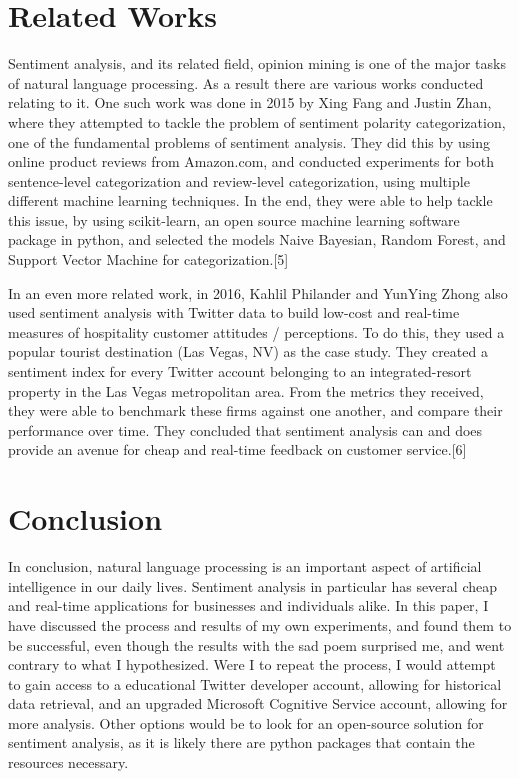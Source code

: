 \documentclass[]{article}
\begin{document}
    \section{Related Works}
    Sentiment analysis, and its related field, opinion mining is one of the major tasks of natural language processing.
    As a result there are various works conducted relating to it. One such work was done in 2015 by Xing Fang and Justin Zhan,
    where they attempted to tackle the problem of sentiment polarity categorization, one of the fundamental problems of 
    sentiment analysis. They did this by using online product reviews from Amazon.com, and conducted experiments for
    both sentence-level categorization and review-level categorization, using multiple different machine learning techniques.
    In the end, they were able to help tackle this issue, by using scikit-learn, an open source machine learning software
    package in python, and selected the models Naive Bayesian, Random Forest, and Support Vector Machine for categorization.[5]

    In an even more related work, in 2016, Kahlil Philander and YunYing Zhong also used sentiment analysis with Twitter data
    to build low-cost and real-time measures of hospitality customer attitudes / perceptions. To do this, they used a popular
    tourist destination (Las Vegas, NV) as the case study. They created a sentiment index for every Twitter account belonging
    to an integrated-resort property in the Las Vegas metropolitan area. From the metrics they received, they were able to 
    benchmark these firms against one another, and compare their performance over time. They concluded that sentiment analysis
    can and does provide an avenue for cheap and real-time feedback on customer service.[6]

    \section{Conclusion}
    In conclusion, natural language processing is an important aspect of artificial intelligence in our daily lives. Sentiment
    analysis in particular has several cheap and real-time applications for businesses and individuals alike. In this paper, 
    I have discussed the process and results of my own experiments, and found them to be successful, even though the results 
    with the sad poem surprised me, and went contrary to what I hypothesized. Were I to repeat the process, I would attempt to 
    gain access to a educational Twitter developer account, allowing for historical data retrieval, and an upgraded Microsoft 
    Cognitive Service account, allowing for more analysis. Other options would be to look for an open-source solution for 
    sentiment analysis, as it is likely there are python packages that contain the resources necessary.
\end{document}
